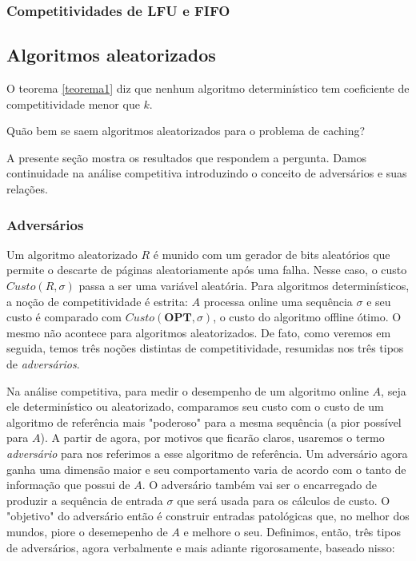 \documentclass[a4paper,oneside,reqno,12pt]{amsart}
\begin{document}
\subsubsection{Competitividades de \textbf{LFU} e \textbf{FIFO}}

\subsection{Algoritmos aleatorizados}

O teorema \ref{teorema1} diz que nenhum algoritmo determinístico tem coeficiente de competitividade menor que \(k\). 

\begin{question}
Quão bem se saem algoritmos aleatorizados para o problema de caching?
\end{question}

A presente seção mostra os resultados que respondem a pergunta. Damos continuidade na análise competitiva introduzindo o conceito de adversários e suas relações.

\subsubsection{Adversários}

Um algoritmo aleatorizado \(R\) é munido com um gerador de bits aleatórios que permite o descarte de páginas aleatoriamente após uma falha. Nesse caso, o custo \(Custo(R,\sigma)\) passa a ser uma variável aleatória. Para algoritmos determinísticos, a noção de competitividade é estrita: \(A\) processa online uma sequência \(\sigma\) e seu custo é comparado com \(Custo(\textbf{OPT}, \sigma)\), o custo do algoritmo offline ótimo. O mesmo não acontece para algoritmos aleatorizados. De fato, como veremos em seguida, temos três noções distintas de competitividade, resumidas nos três tipos de \textit{adversários}. 

Na análise competitiva, para medir o desempenho de um algoritmo online \(A\), seja ele determinístico ou aleatorizado, comparamos seu custo com o custo de um algoritmo de referência mais "poderoso" para a mesma sequência (a pior possível para \(A\)). 
A partir de agora, por motivos que ficarão claros, usaremos o termo \textit{adversário} para nos referimos a esse algoritmo de referência. Um adversário agora ganha uma dimensão maior e seu comportamento varia de acordo com o tanto de informação que possui de \(A\). O adversário também vai ser o encarregado de produzir a sequência de entrada \(\sigma\) que será usada para os cálculos de custo. O "objetivo" do adversário então é construir entradas patológicas que, no melhor dos mundos, piore o desemepenho de \(A\) e melhore o seu. Definimos, então, três tipos de adversários, agora verbalmente e mais adiante rigorosamente, baseado nisso:
\end{document}
